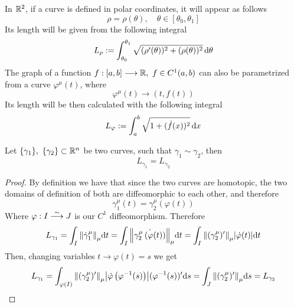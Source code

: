 \documentclass[../complete.tex]{subfiles}
\begin{document}
\begin{rmk}
	In $\R^2$, if a curve is defined in polar coordinates, it will appear as follows
	\begin{equation}
		\rho=\rho(\theta),\quad\theta\in[\theta_0,\theta_1]
		\label{eq:polarcurve}
	\end{equation}
	Its length will be given from the following integral
	\begin{equation}
		L_\rho:=\int_{\theta_0}^{\theta_1}\sqrt{(\rho'(\theta))^2+(\rho(\theta))^2}\diff{\theta}
		\label{eq:polarcurvelength}
	\end{equation}
	The graph of a function $f:[a,b]\fto\R,\ f\in C^1(a,b)$ can also be parametrized from a curve $\varphi^\mu(t)$, where
	\begin{equation}
		\varphi^\mu(t)\to(t,f(t))
		\label{eq:1dfgraph}
	\end{equation}
	Its length will be then calculated with the following integral
	\begin{equation}
		L_\varphi:=\int_{a}^{b}\sqrt{1+(\dot{f}(x))^2}\diff{x}
		\label{eq:1dfgraphlength}
	\end{equation}
\end{rmk}
\begin{thm}
	Let $\{\gamma_1\},\ \{\gamma_2\}\subset\R^n$ be two curves, such that $\gamma_1\sim\gamma_2$, then
	\begin{equation*}
		L_{\gamma_1}=L_{\gamma_2}
	\end{equation*}
\end{thm}
\begin{proof}
	By definition we have that since the two curves are homotopic, the two domains of definition of both are diffeomorphic to each other, and therefore
	\begin{equation}
		\gamma_1^\mu(t)=\gamma_2^\mu\left(\varphi(t)\right)
		\label{eq:diffeomorph}
	\end{equation}
	Where $\varphi:I\fto[\sim]J$ is our $C^1$ diffeomorphism. Therefore
	\begin{equation*}
		L_{\gamma_1}=\int_{I}^{}\norm{\dot{\gamma}_1^\mu}_\mu\dd t=\int_{I}\norm{\dot{\gamma_2^\mu\left( \varphi(t) \right)}}_\mu\dd t=\int_{I}^{}\norm{(\gamma_2^\mu)'}_\mu\abs{\dot{\varphi}(t)}\dd t
	\end{equation*}
	Then, changing variables $t\to\varphi(t)=s$ we get
	\begin{equation*}
		L_{\gamma_1}=\int_{\varphi(I)}^{}\norm{(\gamma_2^\mu)'}_\mu\abs{\dot{\varphi}\left( \varphi^{-1}(s) \right)}(\varphi^{-1}(s))'\dd s=\int_{J}^{}\norm{(\gamma_2^\mu)'}_\mu\dd s=L_{\gamma_2}
	\end{equation*}
\end{proof}
\end{document}
